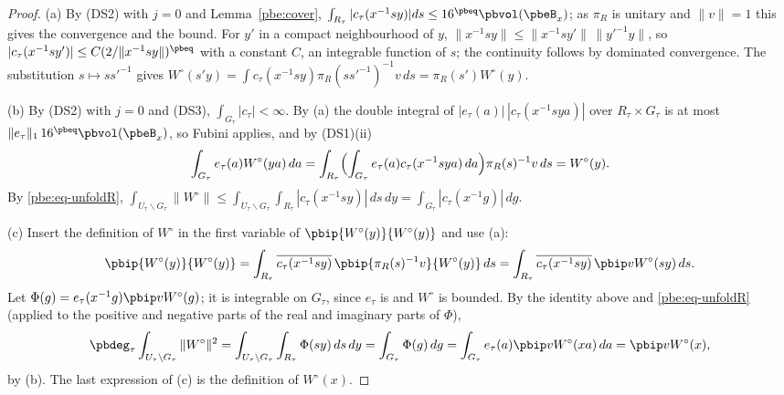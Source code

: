 \documentclass[10pt]{amsart}
\theoremstyle{definition}
\theoremstyle{remark}
\providecommand{\aubar}[1]{\overline{#1}}
\begin{document}
\begin{proof}
(a) By \textup{(DS2)} with $j=0$ and Lemma~\ref{pbe:cover}, $\int_{R_\tau}|c_\tau(x^{-1}sy)|ds\le16^{
\pbeq}\pbvol(\pbeB_x)$; as $\pi_R$ is unitary and $\|v\|=1$ this gives the convergence and the bound.
For $y'$ in a compact neighbourhood of $y$, $\|x^{-1}sy\|\le\|x^{-1}sy'\|\,\|y'^{-1}y\|$, so
$|c_\tau(x^{-1}sy')|\le C(2/\|x^{-1}sy\|)^{\pbeq}$ with a constant $C$, an integrable function of $s$;
the continuity follows by dominated convergence. The substitution $s\mapsto ss'^{-1}$ gives
$W^\circ(s'y)=\int c_\tau(x^{-1}sy)\pi_R(ss'^{-1})^{-1}v\,ds=\pi_R(s')W^\circ(y)$.

(b) By \textup{(DS2)} with $j=0$ and \textup{(DS3)}, $\int_{G_\tau}|c_\tau|<\infty$. By (a) the
double integral of $|e_\tau(a)|\,|c_\tau(x^{-1}sya)|$ over $R_\tau\times G_\tau$ is at most
$\|e_\tau\|_1\,16^{\pbeq}\pbvol(\pbeB_x)$, so Fubini applies, and by \textup{(DS1)(ii)}
\[
\int_{G_\tau}e_\tau(a)W^\circ(ya)\,da=\int_{R_\tau}\Bigl(\int_{G_\tau}e_\tau(a)c_\tau(x^{-1}sya)\,da
\Bigr)\pi_R(s)^{-1}v\,ds=W^\circ(y).
\]
By \eqref{pbe:eq-unfoldR}, $\int_{U_\tau\backslash G_\tau}\|W^\circ\|\le\int_{U_\tau\backslash G_\tau}
\int_{R_\tau}|c_\tau(x^{-1}sy)|\,ds\,dy=\int_{G_\tau}|c_\tau(x^{-1}g)|\,dg$.

(c) Insert the definition of $W^\circ$ in the first variable of $\pbip{W^\circ(y)}{W^\circ(y)}$ and
use (a):
\[
\pbip{W^\circ(y)}{W^\circ(y)}=\int_{R_\tau}\aubar{c_\tau(x^{-1}sy)}\,\pbip{\pi_R(s)^{-1}v}{W^\circ(y)}
\,ds=\int_{R_\tau}\aubar{c_\tau(x^{-1}sy)}\,\pbip v{W^\circ(sy)}\,ds .
\]
Let $\Phi(g)=e_\tau(x^{-1}g)\pbip v{W^\circ(g)}$; it is integrable on $G_\tau$, since $e_\tau$ is and
$W^\circ$ is bounded. By the identity above and \eqref{pbe:eq-unfoldR} (applied to the positive and
negative parts of the real and imaginary parts of $\Phi$),
\[
\pbdeg_\tau\int_{U_\tau\backslash G_\tau}\|W^\circ\|^2=\int_{U_\tau\backslash G_\tau}\int_{R_\tau}\Phi(
sy)\,ds\,dy=\int_{G_\tau}\Phi(g)\,dg=\int_{G_\tau}e_\tau(a)\pbip v{W^\circ(xa)}\,da=\pbip v{W^\circ
(x)},
\]
by (b). The last expression of (c) is the definition of $W^\circ(x)$.


\end{proof}
\end{document}
